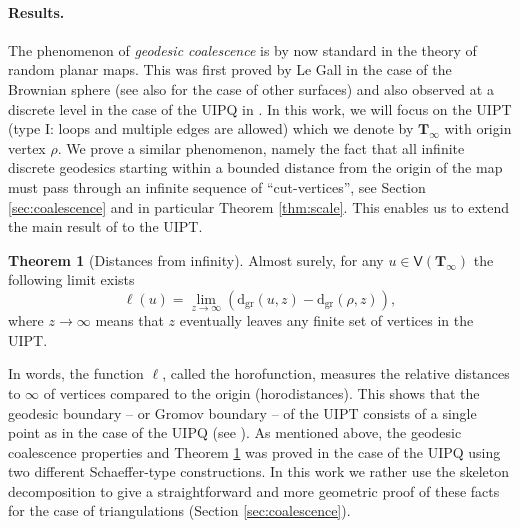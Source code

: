 \documentclass[10pt]{amsart}
\theoremstyle{definition}\newtheorem{defi}[theo]{Definition}\newtheorem{rema}[theo]{Remark}\newtheorem{exam}[theo]{Example}\newtheorem{exem}[theo]{Example}\newtheorem{nota}[theo]{Notation}
\newtheorem{theorem}[theo]{Theorem}\newtheorem{thm}[theo]{Theorem}\newtheorem{lemma}[theo]{Lemma}\newtheorem{proposition}[theo]{Proposition}\newtheorem{corollary}[theo]{Corollary}\newtheorem{remark}[theo]{Remark}\newtheorem{definition}[theo]{Definition}
\begin{document}
\paragraph{Results.} The phenomenon of \emph{geodesic coalescence} is by now standard in the theory of random planar maps. This was first proved by Le Gall \cite{LG09} in the case of the Brownian sphere (see also \cite{Bet16} for the case of other surfaces) and also observed at a discrete level in the case of the UIPQ in \cite{CMM10}. In this work, we will focus on the UIPT (type I: loops and multiple edges are allowed) which we denote by $ \mathbf{T}_{\infty}$ with origin vertex $\rho$. We prove a similar phenomenon, namely the fact that all infinite discrete geodesics starting within a bounded distance from the origin of the map must pass through an infinite sequence of ``cut-vertices'', see Section \ref{sec:coalescence} and in particular Theorem \ref{thm:scale}. This enables us to extend the main result of \cite{CMM10} to the UIPT.

\begin{theorem}[Distances from infinity] \label{thm:CMM} Almost
  surely, for any %
  \mbox{$u \in \mathsf{V}(\mathbf{T}_{\infty})$} the following limit exists
$$ \ell(u) = \lim_{z \to \infty} \left( \mathrm{d_{gr}}(u, z) - \mathrm{d_{gr}}(\rho,z)\right),$$
where
 $z \to \infty$ means that $z$ eventually leaves any finite set of vertices in the UIPT.
\end{theorem}
In words, the function $\ell$, called the horofunction, measures the relative distances to $\infty$ of vertices compared to the origin (horodistances). This shows that the geodesic boundary -- or Gromov boundary -- of the UIPT consists of a single point as in the case of the UIPQ (see \cite[Section 2.5.1]{CMM10}). As mentioned above, the geodesic coalescence properties and Theorem \ref{thm:CMM}  was proved  \cite{CMM10}  in the case of the UIPQ using two different Schaeffer-type constructions. In this work we rather use the skeleton decomposition to give a straightforward and more geometric proof of these facts for the case of triangulations (Section \ref{sec:coalescence}).
\bigskip
\end{document}
